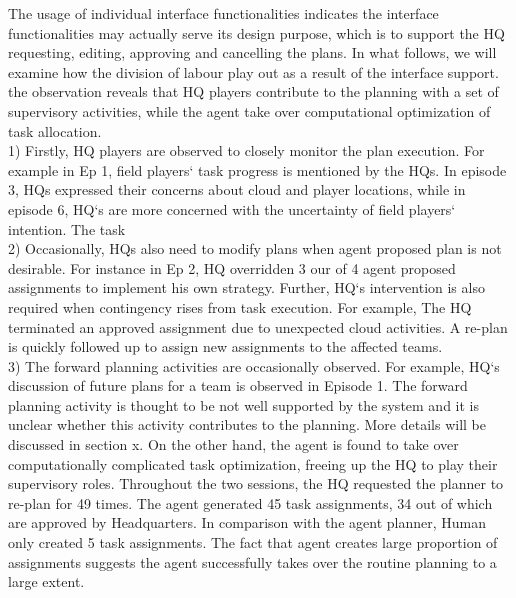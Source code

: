 The usage of individual interface functionalities indicates the interface functionalities may actually serve its design purpose, which is to support the HQ requesting, editing, approving and cancelling the plans. In what follows, we will examine how the division of labour play out as a result of the interface support. the observation reveals that HQ players contribute to the planning with a set of supervisory activities, while the agent take over computational optimization of task allocation. \\

1) Firstly, HQ players are observed to closely monitor the plan execution. For example in Ep 1, field players` task progress is mentioned by the HQs. In episode 3, HQs expressed their concerns about cloud and player locations, while in episode 6, HQ`s are more concerned with the uncertainty of field players` intention. The task \\

2) Occasionally, HQs also need to modify plans when agent proposed plan is not desirable. For instance in Ep 2, HQ overridden 3 our of 4 agent proposed assignments to implement his own strategy. Further, HQ`s intervention is also required when contingency rises from task execution. For example, The HQ terminated an approved assignment due to unexpected cloud activities. A re-plan is quickly followed up to assign new assignments to the affected teams.\\ 

3) The forward planning activities are occasionally observed. For example, HQ`s discussion of future plans for a team is observed in Episode 1. The forward planning activity is thought to be not well supported by the system and it is unclear whether this activity contributes to the planning. More details will be discussed in section x. On the other hand, the agent is found to take over computationally complicated task optimization, freeing up the HQ to play their supervisory roles. Throughout the two sessions, the HQ requested the planner to re-plan for 49 times. The agent generated 45 task assignments, 34 out of which are approved by Headquarters. In comparison with the agent planner, Human only created 5 task assignments. The fact that agent creates large proportion of assignments suggests the agent successfully takes over the routine planning to a large extent. \\


